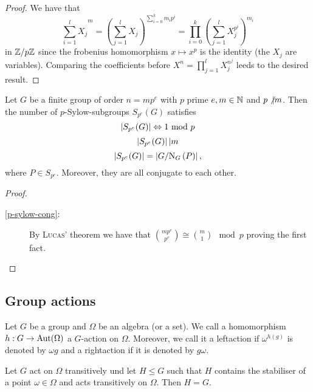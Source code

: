 \documentclass[8pt,a4paper]{article}
\begin{document}
\begin{proof}
    We have that
    \[
    {\sum_{i=1}^l{X_j}}^m={\left(\sum_{j=1}^l{X_j}\right)}^{\sum_{i=0}^k{m_i p^i}}=\prod_{i=0}^k{{\left(\sum_{j=1}^l{X_j^{p^i}}\right)}^{m_i}}
    \]
    in $\mathbb{Z}/{p\mathbb{Z}}$ since the frobenius homomorphism $x\mapsto x^p$ is the identity (the $X_j$ are variables). Comparing the coefficients before $X^n=\prod_{j=1}^l{X^{n^j}_j}$ leeds to the desired result.
\end{proof}

\begin{theorem}
    Let $G$ be a finite group of order $n=mp^e$ with $p$ prime $e,m\in\mathbb{N}$ and $p\not| m$.
    Then the number of $p$-Sylow-subgroups $S_{p^e}(G)$ satisfies
    $$
    \left|S_{p^e}(G)\right| \Leftrightarrow 1 \textrm{ mod } p\label{p-sylow-cong}
    $$
    $$
    \left|S_{p^e}(G)\right| | m\label{p-sylow-div}
    $$
    $$
    \card{S_{p^e}(G)} = \card{G/\normalisor[G]{P}}\label{p-sylow-nor},
    $$
    where $P\in S_{p^e}$.    
    Moreover, they are all conjugate to each other.
\end{theorem}

\begin{proof}
    \begin{description}
        \item[\ref{p-sylow-cong}:]
    By \textsc{Lucas}' theorem we have that $\binom{mp^e}{p^e}\cong\binom{m}{1} \mod p$ proving the first fact.
    \end{description}
\end{proof}
%

    
\subsection{Group actions}

\begin{definition}
    Let $G$ be a group and $\Omega$ be an algebra (or a set). We call a homomorphism $h:G\rightarrow\mathop\mathrm{Aut}\nolimits(\Omega)$ a $G$-action on $\Omega$.
    Moreover, we call it a leftaction if $\omega^{h(g)}$ is denoted by $\omega g$ and a rightaction if it is denoted by $g \omega$.
\end{definition}

\begin{lemma} Let $G$ act on $\Omega$ transitively und let $H\leq G$ such that $H$ contains the stabiliser of a point $\omega\in\Omega$ and acts transitively on $\Omega$. Then $H=G$.
\end{lemma}
\end{document}
